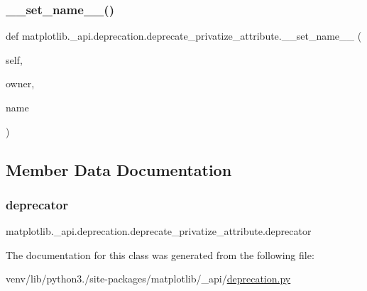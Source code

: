 \subsubsection{\texorpdfstring{\+\_\+\+\_\+set\+\_\+name\+\_\+\+\_\+()}{\_\_set\_name\_\_()}}
{\footnotesize\ttfamily def matplotlib.\+\_\+api.\+deprecation.\+deprecate\+\_\+privatize\+\_\+attribute.\+\_\+\+\_\+set\+\_\+name\+\_\+\+\_\+ (\begin{DoxyParamCaption}\item[{}]{self,  }\item[{}]{owner,  }\item[{}]{name }\end{DoxyParamCaption})}



\subsection{Member Data Documentation}
\mbox{\label{classmatplotlib_1_1__api_1_1deprecation_1_1deprecate__privatize__attribute_a41364120bf1f2e52b90d6e403a108b19}} 
\subsubsection{\texorpdfstring{deprecator}{deprecator}}
{\footnotesize\ttfamily matplotlib.\+\_\+api.\+deprecation.\+deprecate\+\_\+privatize\+\_\+attribute.\+deprecator}



The documentation for this class was generated from the following file\+:\begin{DoxyCompactItemize}
\item 
venv/lib/python3./site-\/packages/matplotlib/\+\_\+api/\hyperlink{matplotlib_2__api_2deprecation_8py}{deprecation.\+py}\end{DoxyCompactItemize}
